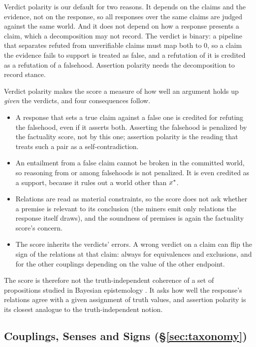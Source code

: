 Verdict polarity is our default for two reasons. It depends on the claims and the evidence, not on
the response, so all responses over the same claims are judged against the same world. And it does
not depend on how a response presents a claim, which a decomposition may not record. The verdict is
binary: a pipeline that separates refuted from unverifiable claims must map both to $0$, so a claim
the evidence fails to support is treated as false, and a refutation of it is credited as a
refutation of a falsehood. Assertion polarity needs the decomposition to record stance.

Verdict polarity makes the score a measure of how well an argument holds up \emph{given} the
verdicts, and four consequences follow.
\begin{itemize}[leftmargin=1.2em,itemsep=1pt,topsep=2pt]
\item A response that sets a true claim against a false one is credited for refuting the
  falsehood, even if it asserts both. Asserting the falsehood is penalized by the factuality score,
  not by this one; assertion polarity is the reading that treats such a pair as a
  self-contradiction.
\item An entailment from a false claim cannot be broken in the committed world, so reasoning from
  or among falsehoods is not penalized. It is even credited as a support, because it rules out a
  world other than $x^{\ast}$.
\item Relations are read as material constraints, so the score does not ask whether a premise is
  relevant to its conclusion (the miners emit only relations the response itself draws), and the
  soundness of premises is again the factuality score's concern.
\item The score inherits the verdicts' errors. A wrong verdict on a claim can flip the sign of the
  relations at that claim: always for equivalences and exclusions, and for the other couplings
  depending on the value of the other endpoint.
\end{itemize}
The score is therefore not the truth-independent coherence of a set of propositions studied in
Bayesian epistemology \citep{shogenji1999,olsson2002}. It asks how well the response's relations
agree with a given assignment of truth values, and assertion polarity is its closest analogue to
the truth-independent notion.

\subsection{Couplings, Senses and Signs (\S\ref{sec:taxonomy})}

